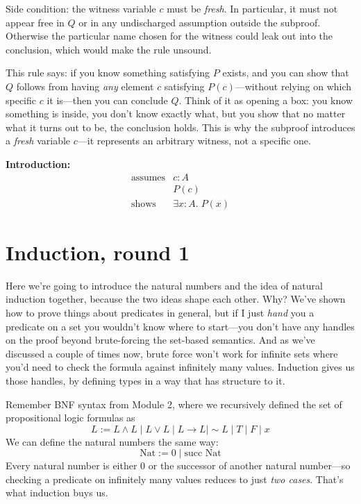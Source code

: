 \documentclass[11pt]{article}
\begin{document}
Side condition: the witness variable $c$ must be \emph{fresh}. In particular, it must not appear free in $Q$ or in any undischarged assumption outside the subproof. Otherwise the particular name chosen for the witness could leak out into the conclusion, which would make the rule unsound.

This rule says: if you know something satisfying $P$ exists, and you can show that $Q$ follows from having \emph{any} element $c$ satisfying $P(c)$---without relying on which specific $c$ it is---then you can conclude $Q$. Think of it as opening a box: you know something is inside, you don't know exactly what, but you show that no matter what it turns out to be, the conclusion holds. This is why the subproof introduces a \emph{fresh} variable $c$---it represents an arbitrary witness, not a specific one.

\noindent\textbf{Introduction:}
\[
  \begin{array}{rl}
    \text{assumes} & c : A \\
                   & P(c) \\
    \hline
    \text{shows} & \exists x : A.\; P(x)
  \end{array}
\]

\section{Induction, round 1}
Here we're going to introduce the natural numbers and the idea of natural induction together, because the two ideas shape each other. Why? We've shown how to prove things about predicates in general, but if I just \emph{hand} you a predicate on a set you wouldn't know where to start---you don't have any handles on the proof beyond brute-forcing the set-based semantics. And as we've discussed a couple of times now, brute force won't work for infinite sets where you'd need to check the formula against infinitely many values. Induction gives us those handles, by defining types in a way that has structure to it.

Remember BNF syntax from Module 2, where we recursively defined the set of propositional logic formulas as
\[
L := L \wedge L \mid L \vee L \mid L \to L \mid {\sim} L \mid T \mid F \mid x
\]
We can define the natural numbers the same way:
\[
\text{Nat} := 0 \mid \text{succ Nat}
\]
Every natural number is either $0$ or the successor of another natural number---so checking a predicate on infinitely many values reduces to just \emph{two cases}. That's what induction buys us.
\end{document}
